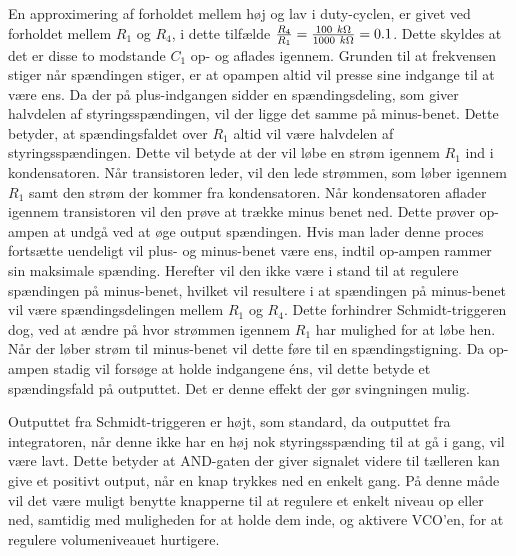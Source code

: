 En approximering af forholdet mellem høj og lav i duty-cyclen, er givet ved forholdet mellem $R_1$ og $R_4$, i dette tilfælde $\frac{R_4}{R_1} = \frac{100~k\ohm}{1000~k\ohm}=0.1$. Dette skyldes at det er disse to modstande $C_1$ op- og aflades igennem.  Grunden til at frekvensen stiger når spændingen stiger, er at opampen altid vil presse sine indgange til at være ens. Da der på plus-indgangen sidder en spændingsdeling, som giver halvdelen af styringsspændingen, vil der ligge det samme på minus-benet. Dette betyder, at spændingsfaldet over $R_1$ altid vil være halvdelen af styringsspændingen. Dette vil betyde at der vil løbe en strøm igennem $R_1$ ind i kondensatoren. Når transistoren leder, vil den lede strømmen, som løber igennem $R_1$ samt den strøm der kommer fra kondensatoren. Når kondensatoren aflader igennem transistoren vil den prøve at trække minus benet ned. Dette prøver op-ampen at undgå ved at øge output spændingen. Hvis man lader denne proces fortsætte uendeligt vil plus- og minus-benet være ens, indtil op-ampen rammer sin maksimale spænding. Herefter vil den ikke være i stand til at regulere spændingen på minus-benet, hvilket vil resultere i at spændingen på minus-benet vil være spændingsdelingen mellem $R_1$ og $R_4$. Dette forhindrer Schmidt-triggeren dog, ved at ændre på hvor strømmen igennem $R_1$ har mulighed for at løbe hen. Når der løber strøm til minus-benet vil dette føre til en spændingstigning. Da op-ampen stadig vil forsøge at holde indgangene éns, vil dette betyde et spændingsfald på outputtet. Det er denne effekt der gør svingningen mulig.

Outputtet fra Schmidt-triggeren er højt, som standard, da outputtet fra integratoren, når denne ikke har en høj nok styringsspænding til at gå i gang, vil være lavt. Dette betyder at AND-gaten der giver signalet videre til tælleren kan give et positivt output, når en knap trykkes ned en enkelt gang. På denne måde vil det være muligt benytte knapperne til at regulere et enkelt niveau op eller ned, samtidig med muligheden for at holde dem inde, og aktivere VCO'en, for at regulere volumeniveauet hurtigere.




